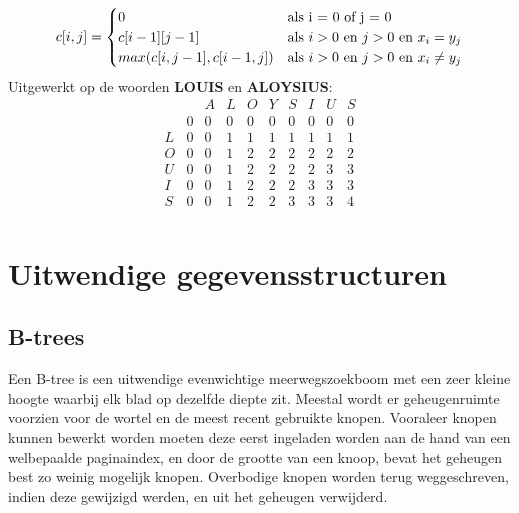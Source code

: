 \documentclass{report}
\begin{document}
 	$$c[i, j] = \begin{cases}
 	0 & \hbox{als i = 0 of j = 0}\\
 	c[i - 1][j - 1] & \hbox{als } i > 0 \hbox{ en } j > 0 \hbox{ en } x_i = y_j \\
 	max(c[i, j - 1], c[i - 1, j]) & \hbox{als } i > 0 \hbox{ en } j > 0 \hbox{ en } x_i \neq y_j
 	\end{cases}$$
 	Uitgewerkt op de woorden \textbf{LOUIS} en \textbf{ALOYSIUS}:
 	$$\begin{matrix} & & A & L & O & Y & S & I & U & S \\ & 0 & 0 & 0 & 0 & 0 & 0 & 0 & 0 & 0 \\ L & 0 & 0 & 1 & 1 & 1 & 1 & 1 & 1 & 1\\ O & 0 & 0 & 1 & 2 & 2 & 2 & 2 & 2 & 2\\ U & 0 & 0 & 1 & 2 & 2 & 2 & 2 & 3 & 3\\ I & 0 & 0 & 1 & 2 & 2 & 2 & 3 & 3 & 3\\ S & 0 & 0 & 1 & 2 & 2 & 3 & 3 & 3 & 4\\ \end{matrix}$$
 	\chapter{Uitwendige gegevensstructuren}
 	\section{B-trees}
 	Een B-tree is een uitwendige evenwichtige meerwegszoekboom met een zeer kleine hoogte waarbij elk blad op dezelfde diepte zit. Meestal wordt er geheugenruimte voorzien voor de wortel en de meest recent gebruikte knopen. Vooraleer knopen kunnen bewerkt worden moeten deze eerst ingeladen worden aan de hand van een welbepaalde paginaindex, en door de grootte van een knoop, bevat het geheugen best zo weinig mogelijk knopen. Overbodige knopen worden terug weggeschreven, indien deze gewijzigd werden, en uit het geheugen verwijderd.
\end{document}

